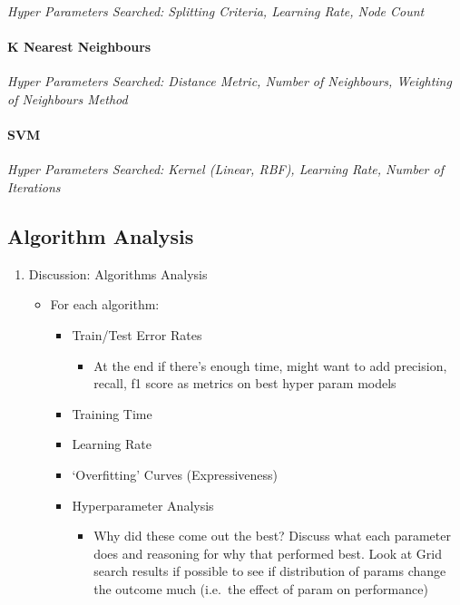 \documentclass[11pt]{article}
\providecommand{\tightlist}{%
      \setlength{\itemsep}{0pt}\setlength{\parskip}{0pt}}
\begin{document}
\emph{Hyper Parameters Searched: Splitting Criteria, Learning Rate, Node
Count}

\hypertarget{k-nearest-neighbours}{%
\paragraph{K Nearest Neighbours}\label{k-nearest-neighbours}}

\emph{Hyper Parameters Searched: Distance Metric, Number of Neighbours,
Weighting of Neighbours Method}

\hypertarget{svm}{%
\paragraph{SVM}\label{svm}}

\emph{Hyper Parameters Searched: Kernel (Linear, RBF), Learning Rate,
Number of Iterations}

    \hypertarget{algorithm-analysis}{%
\subsection{Algorithm Analysis}\label{algorithm-analysis}}

    \begin{enumerate}
\def\labelenumi{\arabic{enumi}.}
\setcounter{enumi}{4}
\tightlist
\item
  Discussion: Algorithms Analysis

  \begin{itemize}
  \tightlist
  \item
    For each algorithm:

    \begin{itemize}
    \tightlist
    \item
      Train/Test Error Rates

      \begin{itemize}
      \tightlist
      \item
        At the end if there's enough time, might want to add precision,
        recall, f1 score as metrics on best hyper param models
      \end{itemize}
    \item
      Training Time
    \item
      Learning Rate
    \item
      `Overfitting' Curves (Expressiveness)
    \item
      Hyperparameter Analysis

      \begin{itemize}
      \tightlist
      \item
        Why did these come out the best? Discuss what each parameter
        does and reasoning for why that performed best. Look at Grid
        search results if possible to see if distribution of params
        change the outcome much (i.e.~the effect of param on
        performance)
      \end{itemize}
    \end{itemize}
  \end{itemize}
\end{enumerate}
\end{document}
